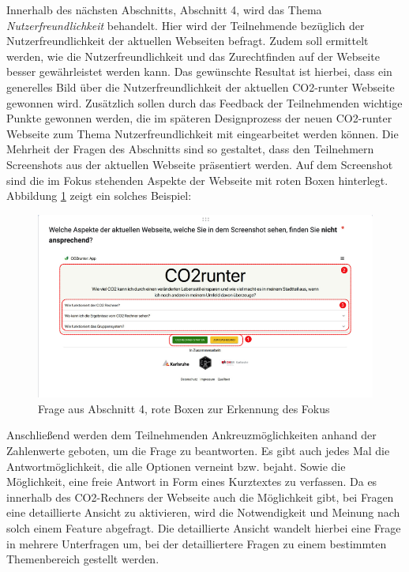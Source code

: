 Innerhalb des nächsten Abschnitts, Abschnitt 4, wird das Thema \textit{Nutzerfreundlichkeit} behandelt.
Hier wird der Teilnehmende bezüglich der Nutzerfreundlichkeit der aktuellen Webseiten befragt.
Zudem soll ermittelt werden, wie die Nutzerfreundlichkeit und das Zurechtfinden auf der Webseite besser gewährleistet werden kann.
Das gewünschte Resultat ist hierbei, dass ein generelles Bild über die Nutzerfreundlichkeit der aktuellen CO2-runter Webseite gewonnen wird.
Zusätzlich sollen durch das Feedback der Teilnehmenden wichtige Punkte gewonnen werden, die im späteren Designprozess der neuen CO2-runter Webseite zum Thema Nutzerfreundlichkeit mit eingearbeitet werden können.
Die Mehrheit der Fragen des Abschnitts sind so gestaltet, dass den Teilnehmern Screenshots aus der aktuellen Webseite präsentiert werden.
Auf dem Screenshot sind die im Fokus stehenden Aspekte der Webseite mit roten Boxen hinterlegt. Abbildung \ref{fig:picture-of-screenshot-with-boxes} zeigt ein solches Beispiel:

\begin{figure}[h]
    \centering
    \includegraphics[width=1\textwidth]{images/05/picture_of_screenshot_with_boxes}
    \caption{Frage aus Abschnitt 4, rote Boxen zur Erkennung des Fokus}
    \label{fig:picture-of-screenshot-with-boxes}
\end{figure}

Anschließend werden dem Teilnehmenden Ankreuzmöglichkeiten anhand der Zahlenwerte geboten, um die Frage zu beantworten.
Es gibt auch jedes Mal die Antwortmöglichkeit, die alle Optionen verneint bzw. bejaht.
Sowie die Möglichkeit, eine freie Antwort in Form eines Kurztextes zu verfassen.
Da es innerhalb des CO2-Rechners der Webseite auch die Möglichkeit gibt, bei Fragen eine detaillierte Ansicht zu aktivieren, wird die Notwendigkeit und Meinung nach solch einem Feature abgefragt.
Die detaillierte Ansicht wandelt hierbei eine Frage in mehrere Unterfragen um, bei der detailliertere Fragen zu einem bestimmten Themenbereich gestellt werden.\

